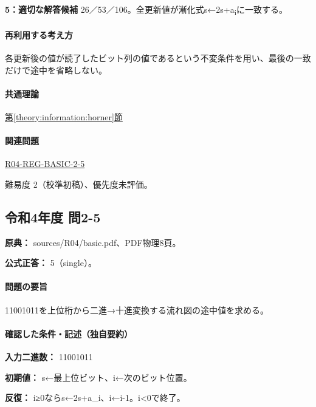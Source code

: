 \noindent\textbf{5：適切な解答候補} 26／53／106。全更新値が漸化式s←2s+a\textsubscript{i}に一致する。\par

\paragraph{再利用する考え方} 各更新後の値が読了したビット列の値であるという不変条件を用い、最後の一致だけで途中を省略しない。

\paragraph{共通理論} \hyperref[theory:information:horner]{第\ref*{theory:information:horner}節}

\paragraph{関連問題} \hyperref[q:r04-reg-basic-2-5]{R04-REG-BASIC-2-5}

\par 難易度 2（校準初稿）、優先度未評価。

\subsection{令和4年度 問2-5}
\label{q:r04-reg-basic-2-5}

\noindent\textbf{原典：} sources/R04/basic.pdf、PDF物理8頁。

\textbf{公式正答：} 5（single）。

\paragraph{問題の要旨} 11001011を上位桁から二進→十進変換する流れ図の途中値を求める。

\paragraph{確認した条件・記述（独自要約）}\mbox{}\par

\noindent\textbf{入力二進数：} 11001011\par

\noindent\textbf{初期値：} s←最上位ビット、i←次のビット位置。\par

\noindent\textbf{反復：} i≥0ならs←2s+a\_i、i←i-1。i<0で終了。\par

